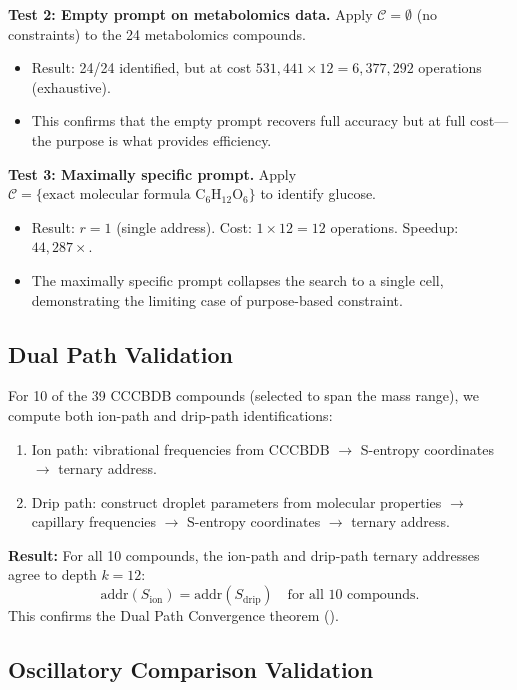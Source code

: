 \documentclass[11pt,twocolumn,a4paper]{article}
\theoremstyle{definition}
\theoremstyle{remark}
\newcommand{\Context}{\mathcal{C}}
\begin{document}
\textbf{Test 2: Empty prompt on metabolomics data.} Apply $\Context = \emptyset$ (no constraints) to the 24 metabolomics compounds.
\begin{itemize}
  \item Result: 24/24 identified, but at cost $531{,}441 \times 12 = 6{,}377{,}292$ operations (exhaustive).
  \item This confirms that the empty prompt recovers full accuracy but at full cost---the purpose is what provides efficiency.
\end{itemize}

\textbf{Test 3: Maximally specific prompt.} Apply $\Context = \{\text{exact molecular formula C}_6\text{H}_{12}\text{O}_6\}$ to identify glucose.
\begin{itemize}
  \item Result: $r = 1$ (single address). Cost: $1 \times 12 = 12$ operations. Speedup: $44{,}287\times$.
  \item The maximally specific prompt collapses the search to a single cell, demonstrating the limiting case of purpose-based constraint.
\end{itemize}

\subsection{Dual Path Validation}\label{sec:dual-validation}

For 10 of the 39 CCCBDB compounds (selected to span the mass range), we compute both ion-path and drip-path identifications:
\begin{enumerate}
  \item Ion path: vibrational frequencies from CCCBDB $\to$ S-entropy coordinates $\to$ ternary address.
  \item Drip path: construct droplet parameters from molecular properties $\to$ capillary frequencies $\to$ S-entropy coordinates $\to$ ternary address.
\end{enumerate}

\textbf{Result:} For all 10 compounds, the ion-path and drip-path ternary addresses agree to depth $k = 12$:
\[
  \mathrm{addr}(S_{\mathrm{ion}}) = \mathrm{addr}(S_{\mathrm{drip}}) \quad \text{for all 10 compounds.}
\]
This confirms the Dual Path Convergence theorem ().

\subsection{Oscillatory Comparison Validation}\label{sec:osc-comparison-validation}
\end{document}
